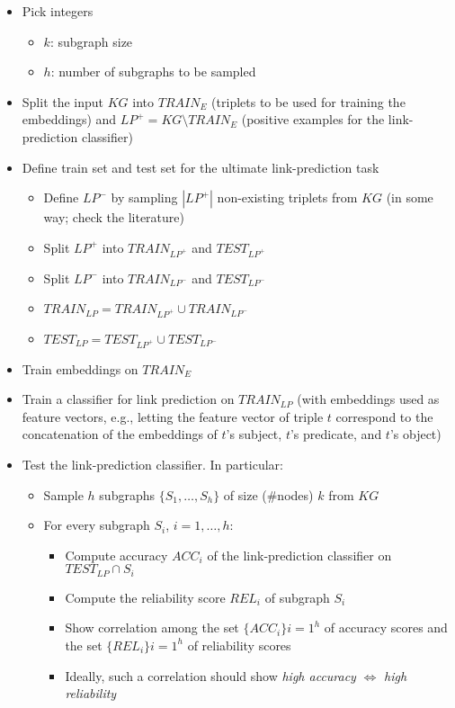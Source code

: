 \documentclass[a4paper,9pt]{article}
\begin{document}
\begin{itemize}

\item Pick integers
\begin{itemize}
\item $k$: subgraph size
\item $h$: number of subgraphs to be sampled
\end{itemize}

\item Split the input $KG$ into $TRAIN_E$ (triplets to be used for training the embeddings) and $LP^+ = KG \setminus TRAIN_E$ (positive examples for the link-prediction classifier)

\item Define train set and test set for the ultimate link-prediction task
\begin{itemize}
\item Define $LP^-$ by sampling $|LP^+|$ non-existing triplets from $KG$ (in some way; check the literature)
\item Split $LP^+$ into $TRAIN_{LP^+}$ and $TEST_{LP^+}$
\item Split $LP^-$ into $TRAIN_{LP^-}$ and $TEST_{LP^-}$
\item $TRAIN_{LP} = TRAIN_{LP^+} \cup TRAIN_{LP^-}$
\item $TEST_{LP} = TEST_{LP^+} \cup TEST_{LP^-}$
\end{itemize}

\item Train embeddings on $TRAIN_E$

\item Train a classifier for link prediction on $TRAIN_{LP}$ (with embeddings used as feature vectors, e.g., letting the feature vector of triple $t$ correspond to the concatenation of the embeddings of $t$'s subject, $t$'s predicate, and $t$'s object)

\item Test the link-prediction classifier. In particular:
\begin{itemize}
\item Sample $h$ subgraphs $\{S_1, \ldots, S_h\}$ of size (\#nodes) $k$ from $KG$
\item For every subgraph $S_i$, $i=1, \ldots, h$:
\begin{itemize}
\item Compute accuracy $ACC_i$ of the link-prediction classifier on $TEST_{LP} \cap S_i$
\item Compute the reliability score $REL_i$ of subgraph $S_i$
\item Show correlation among the set $\{ACC_i\}{i=1}^h$ of accuracy scores and the set $\{REL_i\}{i=1}^h$ of reliability scores
\item Ideally, such a correlation should show \emph{high accuracy} $\Leftrightarrow$ \emph{high reliability}
\end{itemize}
\end{itemize}

\end{itemize}
\end{document}
